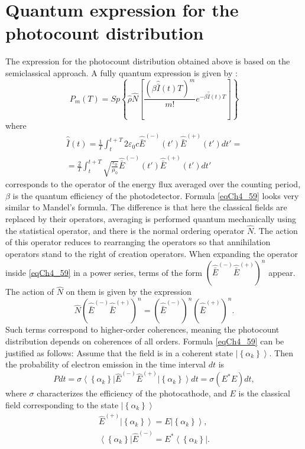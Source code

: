 \section{Quantum expression for the photocount distribution}
The expression for the photocount distribution obtained above is based on
the semiclassical approach. A fully quantum expression is given by \cite{bLoudon1976}:
\begin{equation}
P_m\left(T\right) = Sp \left\{
\hat{\rho}\hat{N}
\left[
\frac{\left(\beta \hat{\bar{I}}\left(t\right) T\right)^m}{m!}
e^{- \beta \hat{\bar{I}}\left(t\right) T}
\right]
\right\} 
\label{eqCh4_59}
\end{equation}
where
\begin{eqnarray}
\hat{\bar{I}}\left(t\right) = \frac{1}{T}\int_t^{t + T}2
\varepsilon_0 c \hat{\bar{E}}^{(-)}\left(t'\right)
\hat{\bar{E}}^{(+)}\left(t'\right)dt' =
\nonumber \\
= \frac{2}{T}\int_t^{t + T}
\sqrt{\frac{\varepsilon_0}{\mu_0}} \hat{\bar{E}}^{(-)}\left(t'\right)
\hat{\bar{E}}^{(+)}\left(t'\right)dt'
\nonumber
\end{eqnarray}
corresponds to the operator of the energy flux averaged over the counting period,
$\beta$ is the quantum efficiency of the photodetector. Formula
\eqref{eqCh4_59} looks very 
similar to Mandel's formula. The difference is that here the classical
fields are replaced by their operators, averaging is performed quantum mechanically
using the statistical operator, and there is the normal ordering operator
$\hat{N}$. The action of this operator reduces to rearranging the operators
so that annihilation operators stand to the right of creation operators.
When expanding
the operator inside \eqref{eqCh4_59} in a power series, terms of the form
$\left(\hat{\bar{E}}^{(-)}\hat{\bar{E}}^{(+)}\right)^n$ appear.  
The action of $\hat{N}$ on them is given by the expression 
\[
\hat{N}\left(\hat{\bar{E}}^{(-)}\hat{\bar{E}}^{(+)}\right)^n = 
\left(\hat{\bar{E}}^{(-)}\right)^n\left(\hat{\bar{E}}^{(+)}\right)^n.
\]
Such terms correspond to higher-order coherences, meaning
the photocount distribution depends on coherences of all orders. Formula \eqref{eqCh4_59} can be justified as follows:
Assume that the field is in a coherent state
$\left|\left\{\alpha_k\right\}\right>$. Then 
the probability of electron emission in the time interval $dt$ is 
\[
Pdt = \sigma
\left<\left\{\alpha_k\right\}\right|
\hat{E}^{(-)} \hat{E}^{(+)}
\left|\left\{\alpha_k\right\}\right> dt = 
\sigma \left(E^{*} E\right)dt,
\]
where $\sigma$ characterizes the efficiency of the photocathode, and $E$ is the classical field corresponding to the state $\left|\left\{\alpha_k\right\}\right>$
\begin{eqnarray}
\hat{E}^{(+)} \left|\left\{\alpha_k\right\}\right> = E \left|\left\{\alpha_k\right\}\right>,
\nonumber \\
\left<\left\{\alpha_k\right\}\right|\hat{E}^{(-)} = E^{*} \left<\left\{\alpha_k\right\}\right|.
\nonumber
\end{eqnarray}

